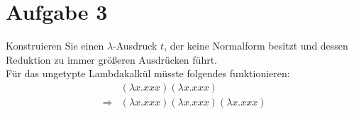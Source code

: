 \documentclass[ngerman,a4paper]{report}
\begin{document}
\section*{Aufgabe 3}
Konstruieren Sie einen $\lambda$-Ausdruck $t$, der keine Normalform besitzt und dessen Reduktion zu immer größeren Ausdrücken führt.\\
%
Für das ungetypte Lambdakalkül müsste folgendes funktionieren:\\
\begin{align*}
	&    (\lambda x.xxx)(\lambda x.xxx)\\
	\Rightarrow&(\lambda x.xxx)(\lambda x.xxx)(\lambda x.xxx)\\
\end{align*}
\end{document}
